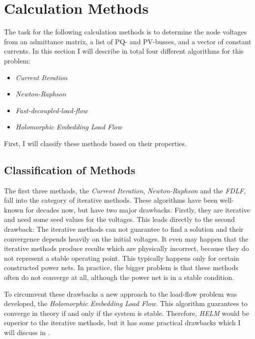 \section{Calculation Methods}
\label{sec:calculation_methods}

The task for the following calculation methods is to determine the node voltages from an admittance matrix, a list of PQ- and PV-busses, and a vector of constant currents. In this section I will describe in total four different algorithms for this problem:
\begin{itemize}
	\item \emph{Current Iteration} \citep[p. 209]{powerSystemAnalysis}
	\item \emph{Newton-Raphson} \citep[p. 232]{powerSystemAnalysis}
	\item \emph{Fast-decoupled-load-flow} \citep[p. 240]{powerSystemAnalysis}
	\item \emph{Holomorphic Embedding Load Flow} \citep{helmIEEE, helmPatentApr2009, helmPatentSept2009}
\end{itemize}

First, I will classify these methods based on their properties.

\subsection{Classification of Methods}

The first three methods, the \emph{Current Iteration}, \emph{Newton-Raphson} and the \emph{FDLF}, fall into the category of iterative methods. These algorithms have been well-known for decades now, but have two major drawbacks. Firstly, they are iterative and need some seed values for the voltages. This leads directly to the second drawback: The iterative methods can not guarantee to find a solution and their convergence depends heavily on the initial voltages. It even may happen that the iterative methods produce results which are physically incorrect, because they do not represent a stable operating point. This typically happens only for certain constructed power nets. In practice, the bigger problem is that these methods often do not converge at all, although the power net is in a stable condition.

To circumvent these drawbacks a new approach to the load-flow problem was developed, the \emph{Holomorphic Embedding Load Flow}. This algorithm guarantees to converge in theory if and only if the system is stable. Therefore, \emph{HELM} would be superior to the iterative methods, but it has some practical drawbacks which I will discuss in . 

